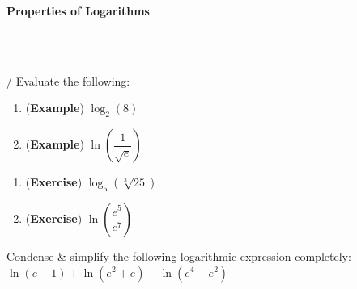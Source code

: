 \documentclass[10pt]{article}
\begin{document}
\newpage%


{\bf Properties of Logarithms}


\,\hfill 
{}
\hfill
{}
\hfill\,\\

\,\hfill
{}
\hfill
{}
\hfill
{}
\hfill\,


 /  Evaluate the following:\\

\begin{minipage}[t][2in]{0.47\textwidth}
\begin{enumerate}
\item[(a)] ({\bf\color{blue}Example}) $\log_2\left( 8\right)$
    \vfill

\item[(b)] ({\bf\color{blue}Example}) $\ln\left( \dfrac{1}{\sqrt{e}} \right)$
    \vfill

\end{enumerate}
\end{minipage}
%
\hfill
%
\begin{minipage}[t][2in]{0.5\textwidth}
\begin{enumerate}
\item[(c)] ({\bf\color{blue}Exercise}) $\log_5\left(\sqrt[3]{25}\right)$
    \vfill

\item[(d)] ({\bf\color{blue}Exercise}) $\ln\left( \dfrac{e^5}{e^7}\right)$
    \vfill

\end{enumerate}
\end{minipage}

 Condense \& simplify the following logarithmic expression completely:\\ 

$\ln(e-1) + \ln(e^2+e) - \ln(e^4-e^2)$
\end{document}

